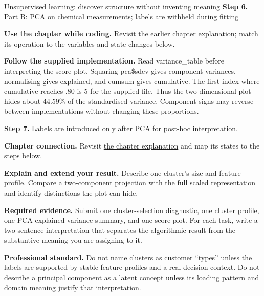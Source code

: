 \begin{labproject}{Unsupervised learning: discover structure without inventing meaning}
\noindent\textbf{Step 6.} Part B: PCA on chemical measurements; labels are withheld during fitting

\textbf{Use the chapter while coding.} Revisit \hyperref[ch:unsupervised]{the earlier chapter explanation}; match its operation to the variables and state changes below.

\textbf{Follow the supplied implementation.} Read variance\_table before interpreting the score plot. Squaring pca\$sdev gives component variances, normalising gives explained, and cumsum gives cumulative. The first index where cumulative reaches .80 is 5 for the supplied file. Thus the two-dimensional plot hides about 44.59\% of the standardised variance. Component signs may reverse between implementations without changing these proportions.




\noindent\textbf{Step 7.} Labels are introduced only after PCA for post-hoc interpretation.

\textbf{Chapter connection.} Revisit \hyperref[ch:unsupervised]{the chapter explanation} and map its states to the steps below.


\begin{verification}
\textbf{Explain and extend your result.} Describe one cluster's size and feature profile. Compare a two-component projection with the full scaled representation and identify distinctions the plot can hide.


\textbf{Required evidence.} Submit one cluster-selection diagnostic, one cluster profile, one PCA explained-variance summary, and one score plot. For each task, write a two-sentence interpretation that separates the algorithmic result from the substantive meaning you are assigning to it.

\textbf{Professional standard.} Do not name clusters as customer ``types'' unless the labels are supported by stable feature profiles and a real decision context. Do not describe a principal component as a latent concept unless its loading pattern and domain meaning justify that interpretation.
\end{verification}
\end{labproject}
